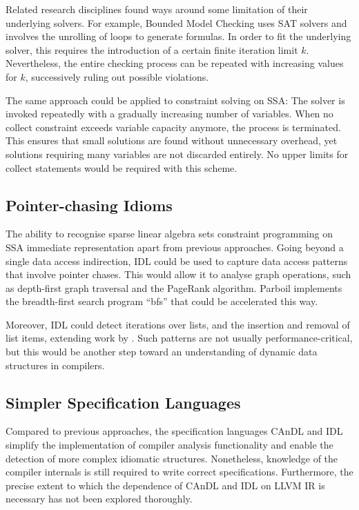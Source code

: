     Related research disciplines found ways around some limitation of their
    underlying solvers.
    For example, Bounded Model Checking \cite{Clarke:2001:BMC:510986.510987}
    uses SAT solvers and involves the unrolling of loops to generate formulas.
    In order to fit the underlying solver, this requires the introduction of a
    certain finite iteration limit $k$.
    Nevertheless, the entire checking process can be repeated with increasing
    values for $k$, successively ruling out possible violations.

    The same approach could be applied to constraint solving on SSA:
    The solver is invoked repeatedly with a gradually increasing number of
    variables.
    When no collect constraint exceeds variable capacity anymore, the
    process is terminated.
    This ensures that small solutions are found without unnecessary
    overhead, yet solutions requiring many variables are not discarded entirely.
    No upper limits for collect statements would be required with this scheme.

\subsection*{Pointer-chasing Idioms}

    The ability to recognise sparse linear algebra sets constraint programming
    on SSA immediate representation apart from previous approaches.
    Going beyond a single data access indirection, IDL could be used to capture
    data access patterns that involve pointer chases.
    This would allow it to analyse graph operations, such as depth-first graph
    traversal and the PageRank algorithm.
    Parboil implements the breadth-first search program ``bfs'' that could be
    accelerated this way.

    Moreover, IDL could detect iterations over lists, and the insertion and
    removal of list items, extending work by
    \citet{Manilov:2018:GPI:3178372.3179511}.
    Such patterns are not usually performance-critical, but this would be
    another step toward an understanding of dynamic data structures in compilers.

\subsection*{Simpler Specification Languages}

    Compared to previous approaches, the specification languages CAnDL and IDL
    simplify the implementation of compiler analysis functionality and enable
    the detection of more complex idiomatic structures.
    Nonetheless, knowledge of the compiler internals is still required to write
    correct specifications.
    Furthermore, the precise extent to which the dependence of CAnDL and IDL on
    LLVM IR is necessary has not been explored thoroughly.

